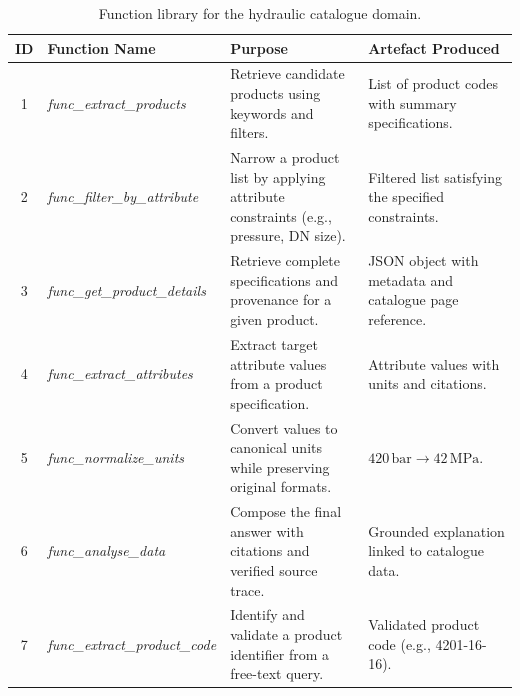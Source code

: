 \documentclass[largeformat]{interact}
\begin{document}
\begin{table}[!htbp]
\captionsetup{width=0.92\linewidth, skip=2pt}
    \caption{Function library for the hydraulic catalogue domain.}
    \label{tab:agent_functions_hydraulic_catalogue}
    \centering
    \small
    \setlength{\tabcolsep}{5pt}
    \renewcommand{\arraystretch}{1}
    \begin{tabularx}{\textwidth}{c >{\raggedright\arraybackslash}p{4cm} p{5.8cm} X}
    \toprule
    \textbf{ID} & 
    \textbf{Function Name} & 
    \textbf{Purpose} &
    \textbf{Artefact Produced} \\
    \midrule
    1 & \textit{func\_extract\_products} &
    Retrieve candidate products using keywords and filters. &
    List of product codes with summary specifications. \\
    \midrule
    2 & \textit{func\_filter\_by\_attribute} &
    Narrow a product list by applying attribute constraints (e.g., pressure, DN size). &
    Filtered list satisfying the specified constraints. \\
    \midrule
    3 & \textit{func\_get\_product\_details} &
    Retrieve complete specifications and provenance for a given product. &
    JSON object with metadata and catalogue page reference. \\
    \midrule
    4 & \textit{func\_extract\_attributes} &
    Extract target attribute values from a product specification. &
    Attribute values with units and citations. \\
    \midrule
    5 & \textit{func\_normalize\_units} &
    Convert values to canonical units while preserving original formats. &
    \(420\,\text{bar} \rightarrow 42\,\text{MPa}\). \\
    \midrule
    6 & \textit{func\_analyse\_data} &
    Compose the final answer with citations and verified source trace. &
    Grounded explanation linked to catalogue data. \\
    \midrule
    7 & \textit{func\_extract\_product\_code} &
    Identify and validate a product identifier from a free-text query. &
    Validated product code (e.g., 4201-16-16). \\
    \bottomrule
    \end{tabularx}
\end{table}
\end{document}
